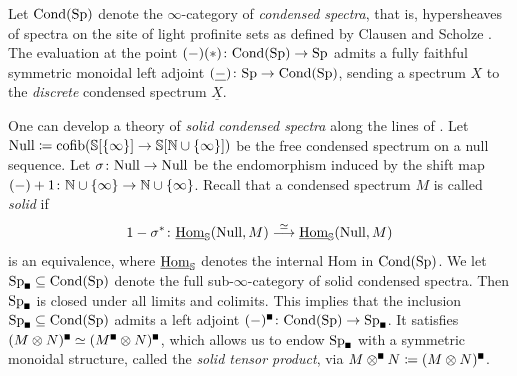 \documentclass[DIV=12,numbers=enddot,leqno,bibliography=totoc]{scrartcl}
\begin{document}
	\begin{numpar}\label{par:CondensedRecollections}
		Let $\operatorname{\mathrm{Cond}}(\mathrm{Sp})$ denote the $\infty$-category of \emph{ condensed spectra}, that is, hypersheaves of spectra on the site of light profinite sets as defined by Clausen and Scholze \cite{AnalyticStacks}. The evaluation at the point $(-)(*)\colon \Cond(\Sp)\rightarrow \Sp$ admits a fully faithful symmetric monoidal left adjoint $(\underline{-})\colon \Sp\rightarrow\Cond(\Sp)$, sending a spectrum $X$ to the \emph{discrete} condensed spectrum $\underline{X}$.
		
		One can develop a theory of \emph{solid condensed spectra} along the lines of \cite[Lectures~\href{https://www.youtube.com/watch?v=bdQ-_CZ5tl8&list=PLx5f8IelFRgGmu6gmL-Kf_Rl_6Mm7juZO}{5}--\href{https://www.youtube.com/watch?v=KKzt6C9ggWA&list=PLx5f8IelFRgGmu6gmL-Kf_Rl_6Mm7juZO}{6}]{AnalyticStacks}. Let $\Null\coloneqq \cofib(\IS[\{\infty\}]\rightarrow\IS[\IN\cup\{\infty\}])$ be the free condensed spectrum on a null sequence. Let $\sigma\colon \Null\rightarrow \Null$ be the endomorphism induced by the shift map $(-)+1\colon \IN\cup\{\infty\}\rightarrow \IN\cup\{\infty\}$. Recall that a condensed spectrum $M$ is called \emph{solid} if
		\begin{equation*}
			1-\sigma^*\colon \Hhom_\IS(\Null,M)\overset{\simeq}{\longrightarrow}\Hhom_\IS(\Null,M)
		\end{equation*}
		is an equivalence, where $\operatorname{\underline{Hom}}_{\mathbb{S}}$ denotes the internal Hom in $\operatorname{\mathrm{Cond}}(\mathrm{Sp})$. We let $\Sp_\solid\subseteq \Cond(\Sp)$ denote the full sub-$\infty$-category of solid condensed spectra. Then $\Sp_\solid$ is closed under all limits and colimits. This implies that the inclusion $\Sp_\solid\subseteq \Cond(\Sp)$ admits a left adjoint $(-)^\solid\colon \Cond(\Sp)\rightarrow \Sp_\solid$. It satisfies $(M\otimes N)^\solid\simeq (M^\solid\otimes N)^\solid$, which allows us to endow $\Sp_\solid$ with a symmetric monoidal structure, called the \emph{solid tensor product}, via $M\soltimes N\coloneqq (M\otimes N)^\solid$.
	\end{numpar}
	
\end{document}

